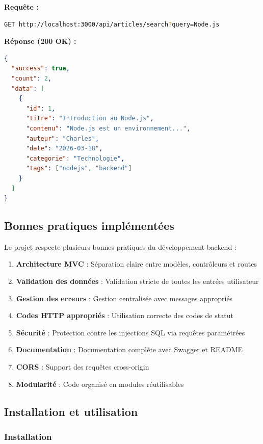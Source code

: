 \documentclass[12pt,a4paper]{article}
\begin{document}
\textbf{Requête :}
\begin{lstlisting}[language=bash]
GET http://localhost:3000/api/articles/search?query=Node.js
\end{lstlisting}

\textbf{Réponse (200 OK) :}
\begin{lstlisting}[language=json]
{
  "success": true,
  "count": 2,
  "data": [
    {
      "id": 1,
      "titre": "Introduction au Node.js",
      "contenu": "Node.js est un environnement...",
      "auteur": "Charles",
      "date": "2026-03-18",
      "categorie": "Technologie",
      "tags": ["nodejs", "backend"]
    }
  ]
}
\end{lstlisting}

\subsection{Bonnes pratiques implémentées}

Le projet respecte plusieurs bonnes pratiques du développement backend :

\begin{enumerate}
    \item \textbf{Architecture MVC} : Séparation claire entre modèles, contrôleurs et routes
    \item \textbf{Validation des données} : Validation stricte de toutes les entrées utilisateur
    \item \textbf{Gestion des erreurs} : Gestion centralisée avec messages appropriés
    \item \textbf{Codes HTTP appropriés} : Utilisation correcte des codes de statut
    \item \textbf{Sécurité} : Protection contre les injections SQL via requêtes paramétrées
    \item \textbf{Documentation} : Documentation complète avec Swagger et README
    \item \textbf{CORS} : Support des requêtes cross-origin
    \item \textbf{Modularité} : Code organisé en modules réutilisables
\end{enumerate}

\subsection{Installation et utilisation}

\subsubsection{Installation}
\end{document}
